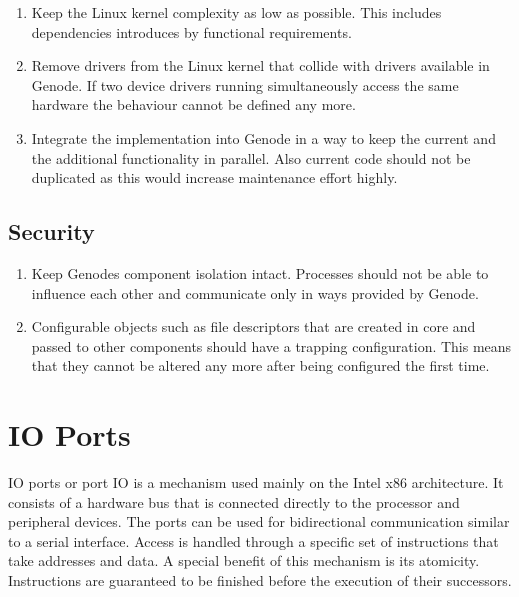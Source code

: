\documentclass[
a4paper,
12pt,
notitlepage,
parskip=half,
DIV=11,
]{scrbook}
\begin{document}
		\begin{enumerate}
			\item \label{req:complexity} Keep the Linux kernel complexity as low as possible.
			This includes dependencies introduces by functional requirements.
			\item \label{req:strip} Remove drivers from the Linux kernel that collide with drivers available in Genode.
			If two device drivers running simultaneously access the same hardware the behaviour cannot be defined any more.
			\item \label{req:integration} Integrate the implementation into Genode in a way to keep the current and the additional functionality in parallel.
			Also current code should not be duplicated as this would increase maintenance effort highly.
		\end{enumerate}
		
		\subsection{Security}
		
		\begin{enumerate}
			\item \label{req:isolation} Keep Genodes component isolation intact.
			Processes should not be able to influence each other and communicate only in ways provided by Genode.
			\item \label{req:traps} Configurable objects such as file descriptors that are created in core and passed to other components should have a trapping configuration.
			This means that they cannot be altered any more after being configured the first time.
			
		\end{enumerate}
		
		\section{IO Ports}
		
		IO ports or port IO is a mechanism used mainly on the Intel x86 architecture.
		It consists of a hardware bus that is connected directly to the processor and peripheral devices.
		The ports can be used for bidirectional communication similar to a serial interface.
		Access is handled through a specific set of instructions that take addresses and data.
		A special benefit of this mechanism is its atomicity.
		Instructions are guaranteed to be finished before the execution of their successors.
		
\end{document}
